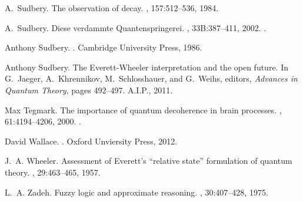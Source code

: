 \documentclass[12pt,reqno]{article}
\renewcommand{\(}{\left(}
\renewcommand{\)}{\right)}
\newcommand{\<}{\langle}
\renewcommand{\>}{\rangle}
\theoremstyle{plain} %
\begin{document}
\begin{thebibliography}{10}
A.~Sudbery.
\newblock The observation of decay.
, 157:512--536, 1984.

A.~Sudbery.
\newblock Diese verdammte {Q}uantenspringerei.
, 33B:387--411, 2002.
.

Anthony Sudbery.
.
\newblock Cambridge University Press, 1986.

Anthony Sudbery.
\newblock The {E}verett-{W}heeler interpretation and the open future.
\newblock In G.~Jaeger, A.~Khrennikov, M.~Schlosshauer, and G.~Weihs, editors,
  {\em Advances in Quantum Theory}, pages 492--497. A.I.P., 2011.

Max Tegmark.
\newblock The importance of quantum decoherence in brain processes.
, 61:4194--4206, 2000.
.

David Wallace.
.
\newblock Oxford Unviersity Press, 2012.

J.~A. Wheeler.
\newblock Assessment of {E}verett's ``relative state'' formulation of quantum
  theory.
, 29:463--465, 1957.

L.~A. Zadeh.
\newblock Fuzzy logic and approximate reasoning.
, 30:407--428, 1975.

\end{thebibliography}




%   
%
\end{document}
